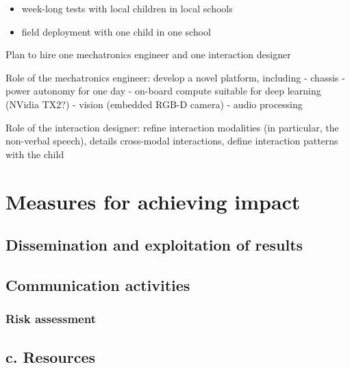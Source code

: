 \documentclass[11pt]{report}
\begin{document}
\begin{itemize}
    \item week-long tests with local children in local schools
    \item field deployment with one child in one school
\end{itemize}


Plan to hire one mechatronics engineer and one interaction designer

Role of the mechatronics engineer: develop a novel platform, including -
chassis - power autonomy for one day - on-board compute suitable for
deep learning (NVidia TX2?) - vision (embedded RGB-D camera) - audio
processing

Role of the interaction designer: refine interaction modalities (in
particular, the non-verbal speech), details cross-modal interactions,
define interaction patterns with the child




\section{Measures for achieving impact}

\subsection{Dissemination and exploitation of results}

\subsection{Communication activities}



\hypertarget{risk-assessment}{%
\subsubsection{Risk assessment}\label{risk-assessment}}

\hypertarget{c.-resources}{%
\subsection{c. Resources}\label{c.-resources}}
\end{document}
